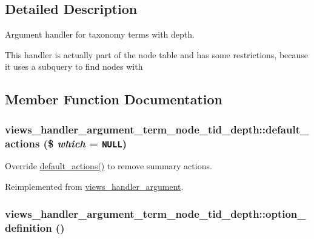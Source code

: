 \subsection{Detailed Description}
Argument handler for taxonomy terms with depth.

This handler is actually part of the node table and has some restrictions, because it uses a subquery to find nodes with 

\subsection{Member Function Documentation}
\hypertarget{classviews__handler__argument__term__node__tid__depth_507f5facd0421728d2d0a5f350839dfc}{
\subsubsection[{default\_\-actions}]{\setlength{\rightskip}{0pt plus 5cm}views\_\-handler\_\-argument\_\-term\_\-node\_\-tid\_\-depth::default\_\-actions (\$ {\em which} = {\tt NULL})}}
\label{classviews__handler__argument__term__node__tid__depth_507f5facd0421728d2d0a5f350839dfc}


Override \hyperlink{classviews__handler__argument__term__node__tid__depth_507f5facd0421728d2d0a5f350839dfc}{default\_\-actions()} to remove summary actions. 

Reimplemented from \hyperlink{classviews__handler__argument_bf38ef334b6e18e0aa43e5a829e3ce33}{views\_\-handler\_\-argument}.\hypertarget{classviews__handler__argument__term__node__tid__depth_e285fe11521bfb9a6cd4f79b498a28a7}{
\subsubsection[{option\_\-definition}]{\setlength{\rightskip}{0pt plus 5cm}views\_\-handler\_\-argument\_\-term\_\-node\_\-tid\_\-depth::option\_\-definition ()}}
\label{classviews__handler__argument__term__node__tid__depth_e285fe11521bfb9a6cd4f79b498a28a7}


